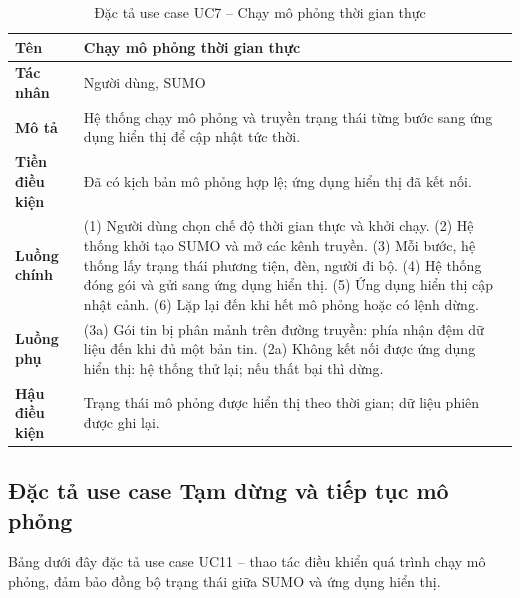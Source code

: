 ﻿\documentclass[../DoAn.tex]{subfiles}
\begin{document}
\begin{table}[H]
	\centering
	\caption{Đặc tả use case UC7 -- Chạy mô phỏng thời gian thực}
	\begin{tabular}{|p{}|p{}|}
		\hline
		\textbf{Tên} & Chạy mô phỏng thời gian thực \\ \hline
		\textbf{Tác nhân} & Người dùng, SUMO \\ \hline
		\textbf{Mô tả} & Hệ thống chạy mô phỏng và truyền trạng thái từng bước sang ứng dụng hiển thị để cập nhật tức thời. \\ \hline
		\textbf{Tiền điều kiện} & Đã có kịch bản mô phỏng hợp lệ; ứng dụng hiển thị đã kết nối. \\ \hline
		\textbf{Luồng chính} & (1) Người dùng chọn chế độ thời gian thực và khởi chạy. (2) Hệ thống khởi tạo \gls{SUMO} và mở các kênh truyền. (3) Mỗi bước, hệ thống lấy trạng thái phương tiện, đèn, người đi bộ. (4) Hệ thống đóng gói và gửi sang ứng dụng hiển thị. (5) Ứng dụng hiển thị cập nhật cảnh. (6) Lặp lại đến khi hết mô phỏng hoặc có lệnh dừng. \\ \hline
		\textbf{Luồng phụ} & (3a) Gói tin bị phân mảnh trên đường truyền: phía nhận đệm dữ liệu đến khi đủ một bản tin. (2a) Không kết nối được ứng dụng hiển thị: hệ thống thử lại; nếu thất bại thì dừng. \\ \hline
		\textbf{Hậu điều kiện} & Trạng thái mô phỏng được hiển thị theo thời gian; dữ liệu phiên được ghi lại. \\
		\hline
	\end{tabular}
\end{table}

\subsection{Đặc tả use case Tạm dừng và tiếp tục mô phỏng}

Bảng dưới đây đặc tả use case UC11 -- thao tác điều khiển quá trình chạy mô
phỏng, đảm bảo đồng bộ trạng thái giữa \gls{SUMO} và ứng dụng hiển thị.
\end{document}
